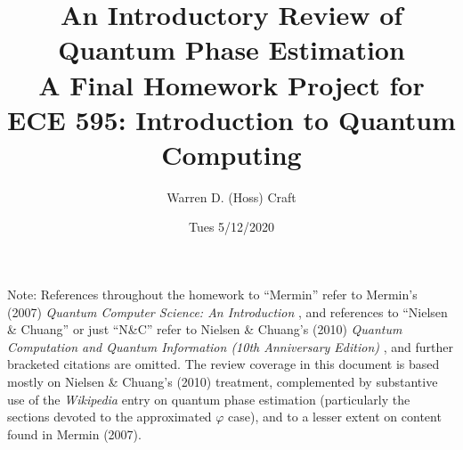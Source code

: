 \documentclass{article}
\title{An Introductory Review of Quantum Phase Estimation\\[0.1in]{\large A Final Homework Project for ECE 595: Introduction to Quantum Computing}}
\author{Warren D. (Hoss) Craft}
\date{Tues 5/12/2020}
\begin{document}
\maketitle

\flushleft

Note: References throughout the homework to ``Mermin'' refer to Mermin's (2007) \textit{Quantum Computer Science: An Introduction} \cite{Mermin_2007}, and references to ``Nielsen \& Chuang'' or just ``N\&C'' refer to Nielsen \& Chuang's (2010) \textit{Quantum Computation and Quantum Information (10th Anniversary Edition)} \cite{Nielsen_&_Chuang_2010}, and further bracketed citations are omitted. The review coverage in this document is based mostly on Nielsen \& Chuang's (2010) treatment, complemented by substantive use of the \textit{Wikipedia} entry on quantum phase estimation \cite{wikipedia:qpe} (particularly the sections devoted to the approximated $\varphi$ case), and to a lesser extent on content found in Mermin (2007).

\vspace{0.25in}
\end{document}
